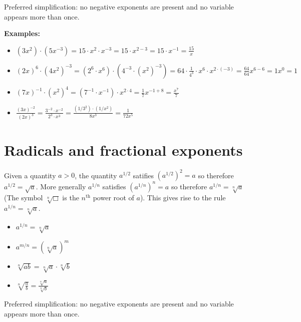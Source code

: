 \documentclass{article}
\begin{document}
Preferred simplification: no negative exponents are present and no variable appears more than once.

\textbf{Examples:}
\begin{itemize}
\item \((3x^2) \cdot (5x^{-3}) = 15 \cdot x^2 \cdot x^{-3} = 15 \cdot x^{2-3} = 15 \cdot x^{-1} = \frac{15}{x}\)
\item \((2x)^6 \cdot (4x^2)^{-3} = (2^6 \cdot x^6) \cdot (4^{-3} \cdot (x^2)^{-3}) = 64 \cdot \frac{1}{4^3} \cdot x^6 \cdot x^{2 \cdot (-3)} = \frac{64}{64}x^{6 - 6} = 1x^0 = 1\)
\item \((7x)^{-1} \cdot (x^2)^4 = (7^{-1} \cdot x^{-1}) \cdot x^{2 \cdot 4} = \frac{1}{7}x^{-1 + 8} = \frac{x^7}{7}\)
\item \(\frac{(3x)^{-2}}{(2x)^3} = \frac{3^{-2} \cdot x^{-2}}{2^3 \cdot x^3} = \frac{(1/3^2) \cdot (1/x^2)}{8x^3} = \frac{1}{72x^5}\)
\end{itemize}





\section{Radicals and fractional exponents}

Given a quantity \(a > 0\), the quantity \(a^{1/2}\) satifies \((a^{1/2})^2 = a\) so therefore \(a^{1/2} = \sqrt{a}\). More generally \(a^{1/n}\) satisfies \((a^{1/n})^n = a\) so therefore \(a^{1/n} = \sqrt[n]{a}\) (The symbol \(\sqrt[n]{\Box}\) is the \(n^\text{th}\) power root of \(a\)). This gives rise to the rule \(a^{1/n} = \sqrt[n]{a}\).

\begin{itemize}
\item \(a^{1/n} = \sqrt[n]{a}\)
\item \(a^{m/n} = (\sqrt[n]{a})^m\)
\item \(\sqrt[n]{ab} = \sqrt[n]{a} \cdot \sqrt[n]{b}\)
\item \(\sqrt[n]{\frac{a}{b}} = \frac{\sqrt[n]{a}}{\sqrt[n]{b}}\)
\end{itemize}

Preferred simplification: no negative exponents are present and no variable appears more than once.
\end{document}
